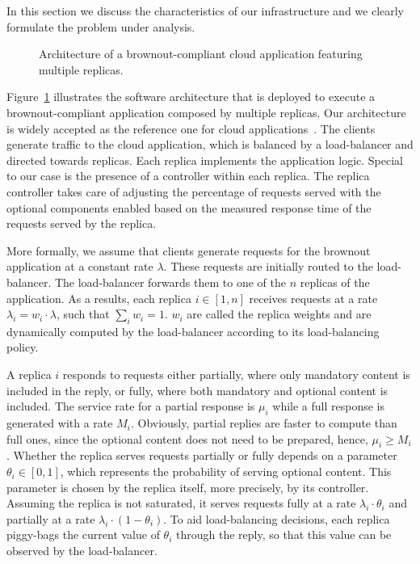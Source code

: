 In this section we discuss the characteristics of our infrastructure
and we clearly formulate the problem under analysis.

\begin{figure}[t]
  \centering 
   
  \caption{Architecture of a brownout-compliant cloud application
    featuring multiple replicas.}
  \label{fig:architecture}
\end{figure}

Figure~\ref{fig:architecture} illustrates the software
architecture that is deployed to execute a brownout-compliant
application composed by multiple replicas. Our architecture
is widely accepted
as the reference one for cloud applications~\citep{Barroso09}. The
clients generate traffic to the cloud application, which is
balanced by a load-balancer and directed towards replicas. Each
replica implements the application logic. Special to our case is the
presence of a controller within each replica. The replica controller
takes care of adjusting the percentage of requests served with the
optional components enabled based on the measured response time of the
requests served by the replica.

More formally, we assume that clients generate requests for the
brownout application at a constant rate $\lambda$. These requests are
initially routed to the load-balancer. The load-balancer forwards them
to one of the $n$ replicas of the application. As a results, each
replica $i \in [1,n]$ receives requests at a rate $\lambda_i = w_i
\cdot \lambda$, such that $\sum_{i} w_i = 1$. $w_i$ are called the replica weights
and are dynamically computed by the load-balancer
according to its
load-balancing policy.

A replica $i$ responds to requests either partially, where only
mandatory content is included in the reply, or fully, where both
mandatory and optional content is included. The service rate for a
partial response is $\mu_i$ while a full response is generated with a
rate $M_i$. Obviously, partial replies are faster to compute than
full ones, since the optional content does not need to be prepared,
hence, $\mu_i \geq M_i$. Whether the replica serves requests partially
or fully depends on a parameter $\theta_i \in [0, 1]$, which
represents the probability of serving optional content. This parameter
is chosen by the replica itself, more precisely, by its controller. Assuming the replica is not
saturated, it serves requests fully at a rate $\lambda_i \cdot
\theta_i$ and partially at a rate $\lambda_i \cdot (1-\theta_i)$. To
aid load-balancing decisions, each replica piggy-bags the current
value of $\theta_i$ through the reply, so that this value can be
observed by the load-balancer.

